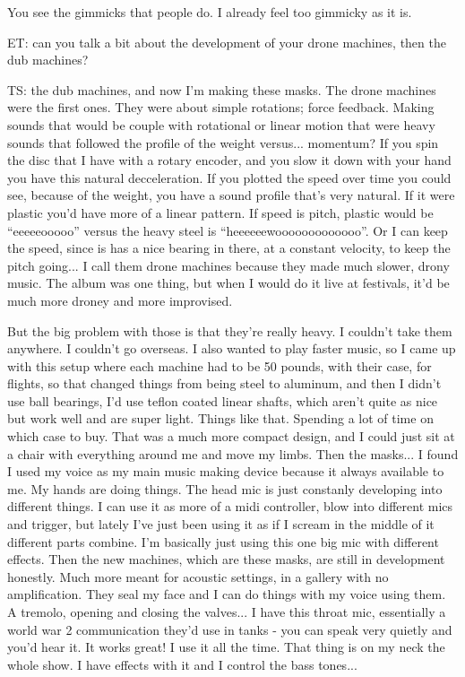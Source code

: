 You see the gimmicks that people do. I already feel too gimmicky as it is. 

ET: can you talk a bit about the development of your drone machines, then the dub machines? 

TS: the dub machines, and now I'm making these masks. The drone machines were the first ones. They were about simple rotations; force feedback. Making sounds that would be couple with rotational or linear motion that were heavy sounds that followed the profile of the weight versus... momentum? If you spin the disc that I have with a rotary encoder, and you slow it down with your hand you have this natural decceleration. If you plotted the speed over time you could see, because of the weight, you have a sound profile that's very natural. If it were plastic you'd have more of a linear pattern. If speed is pitch, plastic would be ``eeeeeooooo'' versus the heavy steel is ``heeeeeewooooooooooooo''. Or I can keep the speed, since is has a nice bearing in there, at a constant velocity, to keep the pitch going... I call them drone machines because they made much slower, drony music. The album was one thing, but when I would do it live at festivals, it'd be much more droney and more improvised. 

But the big problem with those is that they're really heavy. I couldn't take them anywhere. I couldn't go overseas. I also wanted to play faster music, so I came up with this setup where each machine had to be 50 pounds, with their case, for flights, so that changed things from being steel to aluminum, and then I didn't use ball bearings, I'd use teflon coated linear shafts, which aren't quite as nice but work well and are super light. Things like that. Spending a lot of time on which case to buy. That was a much more compact design, and I could just sit at a chair with everything around me and move my limbs. Then the masks... I found I used my voice as my main music making device because it always available to me. My hands are doing things. The head mic is just constanly developing into different things. I can use it as more of a midi controller, blow into different mics and trigger, but lately I've just been using it as if I scream in the middle of it different parts combine. I'm basically just using this one big mic with different effects. Then the new machines, which are these masks, are still in development honestly. Much more meant for acoustic settings, in a gallery with no amplification. They seal my face and I can do things with my voice using them. A tremolo, opening and closing the valves... I have this throat mic, essentially a world war 2 communication they'd use in tanks - you can speak very quietly and you'd hear it. It works great! I use it all the time. That thing is on my neck the whole show. I have effects with it and I control the bass tones... 

